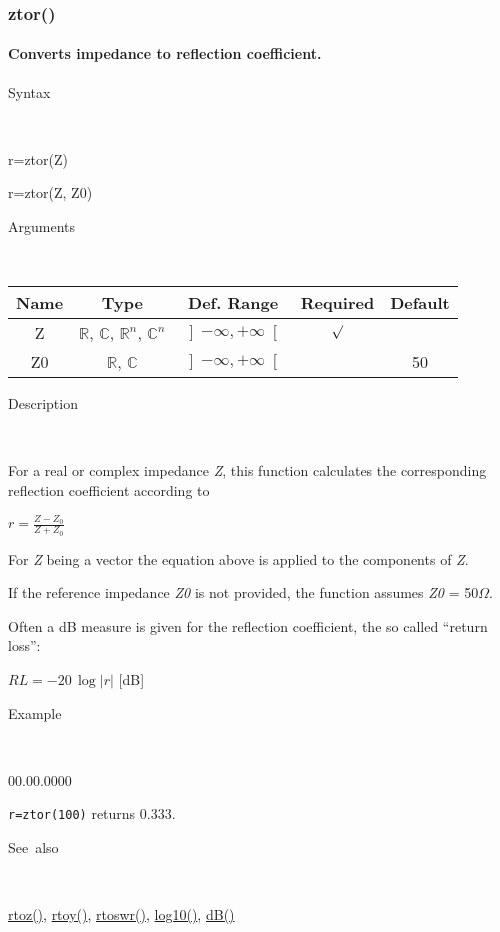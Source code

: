 \newpage
\subsubsection*{\hypertarget{ztor}{}{\Large ztor()}}


\paragraph{\label{par:ztor}Converts impedance to reflection coefficient.}

\begin{description}
\item [Syntax]~
\end{description}
r=ztor(Z)

\noindent r=ztor(Z, Z0)

\begin{description}
\item [Arguments]~
\end{description}
\begin{tabular}{|c|c|c|c|c|}
\hline 
Name&
Type&
Def. Range&
Required&
Default\tabularnewline
\hline
\hline 
Z&
$\mathbb{R}$, $\mathbb{C}$, $\mathbb{R}^{n}$, $\mathbb{C}^{n}$&
$\left]-\infty,+\infty\right[$&
$\surd$&
\tabularnewline
\hline
Z0&
$\mathbb{R}$, $\mathbb{C}$&
$\left]-\infty,+\infty\right[$&
&
50\tabularnewline
\hline
\end{tabular}

\begin{description}
\item [Description]~
\end{description}
For a real or complex impedance \textit{Z}, this function calculates
the corresponding reflection coefficient according to 

\medskip{}
$r={\displaystyle \frac{Z-Z_{0}}{Z+Z_{0}}}$
\medskip{}

\noindent For \textit{Z} being a vector the equation above is applied
to the components of \textit{Z}.

\noindent If the reference impedance \textit{Z0} is not provided,
the function assumes \textit{Z0} = 50$\Omega$.

\noindent Often a dB measure is given for the reflection coefficient,
the so called {}``return loss'':

\noindent $RL=-20\,\log\left|r\right|$ {[}dB{]}

\begin{description}
\item [Example]~
\end{description}
\begin{lyxlist}{00.00.0000}
\item [\texttt{r=ztor(100)}]returns 0.333.
\end{lyxlist}
\begin{description}
\item [See~also]~
\end{description}
\textcolor{blue}{\hyperlink{rtoz}{rtoz()}}\textcolor{black}{,} \textcolor{blue}{\hyperlink{rtoy}{rtoy()}}\textcolor{black}{,}
\textcolor{blue}{\hyperlink{rtoswr}{rtoswr()}}\textcolor{black}{,}
\textcolor{blue}{\hyperlink{log10}{log10()}}\textcolor{black}{,}
\textcolor{blue}{\hyperlink{dB}{dB()}}


